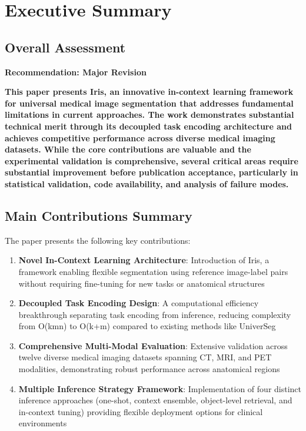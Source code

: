 \section{Executive Summary}
\label{sec:executive_summary}

\subsection{Overall Assessment}
\textbf{Recommendation: Major Revision}

\textbf{This paper presents Iris, an innovative in-context learning framework for universal medical image segmentation that addresses fundamental limitations in current approaches. The work demonstrates substantial technical merit through its decoupled task encoding architecture and achieves competitive performance across diverse medical imaging datasets. While the core contributions are valuable and the experimental validation is comprehensive, several critical areas require substantial improvement before publication acceptance, particularly in statistical validation, code availability, and analysis of failure modes.}

\subsection{Main Contributions Summary}
The paper presents the following key contributions:
\begin{enumerate}
    \item \textbf{Novel In-Context Learning Architecture}: Introduction of Iris, a framework enabling flexible segmentation using reference image-label pairs without requiring fine-tuning for new tasks or anatomical structures
    \item \textbf{Decoupled Task Encoding Design}: A computational efficiency breakthrough separating task encoding from inference, reducing complexity from O(kmn) to O(k+m) compared to existing methods like UniverSeg
    \item \textbf{Comprehensive Multi-Modal Evaluation}: Extensive validation across twelve diverse medical imaging datasets spanning CT, MRI, and PET modalities, demonstrating robust performance across anatomical regions
    \item \textbf{Multiple Inference Strategy Framework}: Implementation of four distinct inference approaches (one-shot, context ensemble, object-level retrieval, and in-context tuning) providing flexible deployment options for clinical environments
\end{enumerate}


